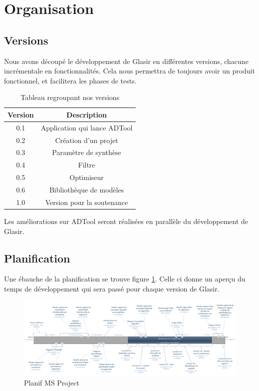 \section{Organisation}
	\subsection{Versions}
		Nous avons découpé le développement de Glasir en différentes versions, chacune incrémentale en fonctionnalités.
		Cela nous permettra de toujours avoir un produit fonctionnel, et facilitera les phases de tests.

		\begin{table}[h!]
			\begin{center}
			\begin{tabular}{|c|c|}
				\hline
				Version & Description\\
				\hline
				0.1 & Application qui lance ADTool\\
				\hline
				0.2 & Création d'un projet\\
				\hline
				0.3 & Paramètre de synthèse\\
				\hline
				0.4 & Filtre\\
				\hline
				0.5 & Optimiseur\\
				\hline
				0.6 & Bibliothèque de modèles\\
				\hline
				1.0 & Version pour la soutenance\\
				\hline
			\end{tabular}
			\end{center}
			\caption{Tableau regroupant nos versions}
		\end{table}

		Les améliorations sur ADTool seront réalisées en parallèle du développement de Glasir.

	\subsection{Planification}
		Une ébauche de la planification se trouve figure \ref{fig:planif}. Celle ci donne un aperçu du temps de développement qui sera passé pour chaque version de Glasir. 

		\begin{figure}
			\begin{center}
				\includegraphics[height=0.50\textwidth,angle=90]{figure/planification.png}
			\end{center}
			\caption{Planif MS Project}
			\label{fig:planif}
		\end{figure}

